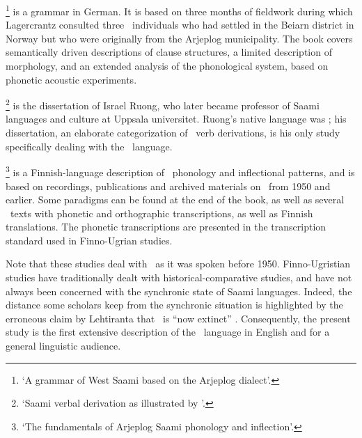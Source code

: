 \footnote{‘A grammar of West Saami based on the Arjeplog dialect’.} \citep{Lagercrantz1926} 
is a grammar in German. It is based on three months of fieldwork during which Lagercrantz consulted three \PS\ individuals who had settled in the Beiarn district in Norway but who were originally from the Arjeplog municipality. The book covers semantically driven descriptions of clause structures, a limited description of morphology, and an extended analysis of the phonological system, based on phonetic acoustic experiments. 

\footnote{‘Saami verbal derivation as illustrated by \PS’.} \citep{Ruong1943} is the dissertation of Israel Ruong, who later became professor of Saami languages and culture at Uppsala universitet. Ruong’s native language was \PS; his dissertation, an elaborate categorization of \PS\ verb derivations, is his only study specifically dealing with the \PS\ language. %

\footnote{‘The fundamentals of Arjeplog Saami phonology and inflection’.} \citep{Lehtiranta1992} is a Fin\-nish-language description of \PS\ phonology and inflectional patterns, and is based on recordings, publications and archived materials on \PS\ from 1950 and earlier. Some paradigms can be found at the end of the book, as well as several \PS\ texts with phonetic and orthographic transcriptions, as well as Finnish translations. The phonetic transcriptions are presented in the transcription standard used in Finno-Ugrian studies. 

Note that these studies deal with \PS\ as it was spoken before 1950. Finno-Ugristian studies have traditionally dealt with historical-comparative studies, and have not always been concerned with the synchronic state of Saami languages. Indeed, the distance some scholars keep from the synchronic situation is highlighted by the erroneous claim by Lehtiranta %
that \PS\ is “now extinct” \citep[English abstract]{Lehtiranta1992}. 
Consequently, the present study is the first extensive description of the \PS\ language in English and for a general linguistic audience. %

